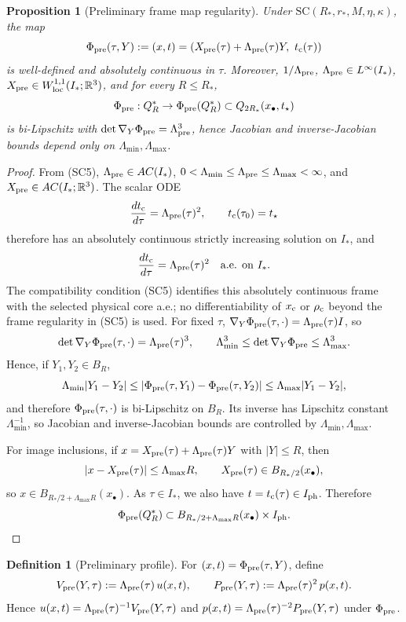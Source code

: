 \documentclass[11pt]{amsart}
\theoremstyle{plain}
\newtheorem{proposition}[theorem]{Proposition}
\theoremstyle{definition}
\newtheorem{definition}[theorem]{Definition}
\theoremstyle{remark}
\newcommand{\RR}{\mathbb R}
\begin{document}
\begin{proposition}[Preliminary frame map regularity]\label{prop:prelim-frame}
Under \(\mathrm{SC}(R_*,r_*,M,\eta,\kappa)\), the map
\[
\Phi_{\rm pre}(\tau,Y):=(x,t)=(X_{\rm pre}(\tau)+\Lambda_{\rm pre}(\tau)Y,\ t_{\rm c}(\tau))
\]
is well-defined and absolutely continuous in \(\tau\).
Moreover, \(1/\Lambda_{\rm pre}\), \(\Lambda_{\rm pre}\in L^\infty(I_*)\),
\(X_{\rm pre}\in W^{1,1}_{\rm loc}(I_*;\RR^3)\), and for every \(R\le R_*\),
\[
\Phi_{\rm pre}:Q_R^*\to \Phi_{\rm pre}(Q_R^*)\subset Q_{2R_*}(x_\bullet,t_\star)
\]
is bi-Lipschitz with \(\det \nabla_Y\Phi_{\rm pre}=\Lambda_{\rm pre}^3\), hence
Jacobian and inverse-Jacobian bounds depend only on \(\Lambda_{\min},\Lambda_{\max}\).
\end{proposition}
\begin{proof}
From \textup{(SC5)}, \(\Lambda_{\rm pre}\in AC(I_*)\),
\(0<\Lambda_{\min}\le \Lambda_{\rm pre}\le\Lambda_{\max}<\infty\), and
\(X_{\rm pre}\in AC(I_*;\mathbb R^3)\). The scalar ODE
\[
\frac{dt_{\rm c}}{d\tau}=\Lambda_{\rm pre}(\tau)^2,\qquad t_{\rm c}(\tau_0)=t_\star
\]
therefore has an absolutely continuous strictly increasing solution on \(I_*\), and
\[
\frac{dt_{\rm c}}{d\tau}=\Lambda_{\rm pre}(\tau)^2
\quad\text{a.e. on }I_*.
\]
The compatibility condition \textup{(SC5)} identifies this absolutely continuous frame
with the selected physical core a.e.; no differentiability of \(x_{\rm c}\) or
\(\rho_{\rm c}\) beyond the frame regularity in \textup{(SC5)} is used.
For fixed \(\tau\), \(\nabla_Y\Phi_{\rm pre}(\tau,\cdot)=\Lambda_{\rm pre}(\tau)I\), so
\[
\det\nabla_Y\Phi_{\rm pre}(\tau,\cdot)=\Lambda_{\rm pre}(\tau)^3,
\qquad
\Lambda_{\min}^3\le \det\nabla_Y\Phi_{\rm pre}\le \Lambda_{\max}^3.
\]
Hence, if \(Y_1,Y_2\in B_R\),
\[
\Lambda_{\min}|Y_1-Y_2|
\le |\Phi_{\rm pre}(\tau,Y_1)-\Phi_{\rm pre}(\tau,Y_2)|
\le \Lambda_{\max}|Y_1-Y_2|,
\]
and therefore \(\Phi_{\rm pre}(\tau,\cdot)\) is bi-Lipschitz on \(B_R\). Its inverse has
Lipschitz constant \(\Lambda_{\min}^{-1}\), so Jacobian and inverse-Jacobian bounds
are controlled by \(\Lambda_{\min},\Lambda_{\max}\).

For image inclusions, if \(x=X_{\rm pre}(\tau)+\Lambda_{\rm pre}(\tau)Y\) with
\(|Y|\le R\), then
\[
|x-X_{\rm pre}(\tau)|\le \Lambda_{\max}R,\qquad
X_{\rm pre}(\tau)\in B_{R_*/2}(x_\bullet),
\]
so \(x\in B_{R_*/2+\Lambda_{\max}R}(x_\bullet)\). As \(\tau\in I_*\), we also have
\(t=t_{\rm c}(\tau)\in I_{\rm ph}\). Therefore
\[
\Phi_{\rm pre}(Q_R^*)\subset B_{R_*/2+\Lambda_{\max}R}(x_\bullet)\times I_{\rm ph}.
\]
\end{proof}
\begin{definition}[Preliminary profile]\label{def:prelim-profile}
For \((x,t)=\Phi_{\rm pre}(\tau,Y)\), define
\[
V_{\rm pre}(Y,\tau):=\Lambda_{\rm pre}(\tau)\,u(x,t),\qquad
P_{\rm pre}(Y,\tau):=\Lambda_{\rm pre}(\tau)^2\,p(x,t).
\]
Hence \(u(x,t)=\Lambda_{\rm pre}(\tau)^{-1}V_{\rm pre}(Y,\tau)\) and
\(p(x,t)=\Lambda_{\rm pre}(\tau)^{-2}P_{\rm pre}(Y,\tau)\) under \(\Phi_{\rm pre}\).
\end{definition}
\end{document}
